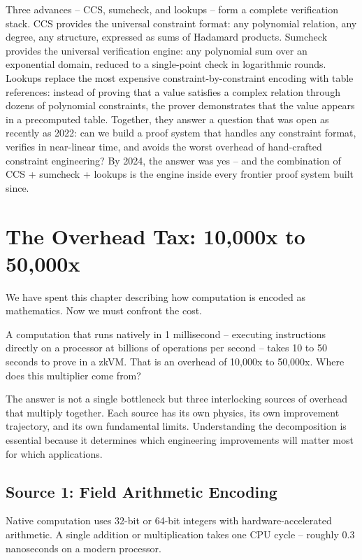 \documentclass[
  11pt,
  openany]{report}
\begin{document}
Three advances -- CCS, sumcheck, and lookups -- form a complete verification
stack. CCS provides the universal constraint format: any polynomial relation,
any degree, any structure, expressed as sums of Hadamard products. Sumcheck
provides the universal verification engine: any polynomial sum over an
exponential domain, reduced to a single-point check in logarithmic rounds.
Lookups replace the most expensive constraint-by-constraint encoding with table
references: instead of proving that a value satisfies a complex relation through
dozens of polynomial constraints, the prover demonstrates that the value appears
in a precomputed table. Together, they answer a question that was open as
recently as 2022: can we build a proof system that handles any constraint
format, verifies in near-linear time, and avoids the worst overhead of
hand-crafted constraint engineering? By 2024, the answer was yes -- and the
combination of CCS + sumcheck + lookups is the engine inside every frontier
proof system built since.

\section{The Overhead Tax: 10,000x to
50,000x}\label{the-overhead-tax-10000x-to-50000x}

We have spent this chapter describing how computation is encoded as mathematics.
Now we must confront the cost.

A computation that runs natively in 1 millisecond -- executing instructions
directly on a processor at billions of operations per second -- takes 10 to 50
seconds to prove in a zkVM. That is an overhead of 10,000x to 50,000x. Where
does this multiplier come from?

The answer is not a single bottleneck but three interlocking sources of overhead
that multiply together. Each source has its own physics, its own improvement
trajectory, and its own fundamental limits. Understanding the decomposition is
essential because it determines which engineering improvements will matter most
for which applications.

\subsection{Source 1: Field Arithmetic
Encoding}\label{source-1-field-arithmetic-encoding}

Native computation uses 32-bit or 64-bit integers with hardware-accelerated
arithmetic. A single addition or multiplication takes one CPU cycle -- roughly
0.3 nanoseconds on a modern processor.
\end{document}

